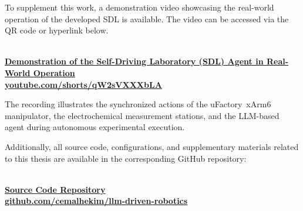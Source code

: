 \begin{anhang}
\begin{lstlisting}[language=json, caption={Fifth User's Inputs}]
\end{lstlisting}

\newpage
{}

To supplement this work, a demonstration video showcasing the real-world operation of the developed SDL is available. The video can be accessed via the QR code or hyperlink below.

\begin{center}
 \\[5pt]
\href{https://youtube.com/shorts/qW2sVXXXbLA}{\textbf{Demonstration of the Self-Driving Laboratory (SDL) Agent in Real-World Operation \\ youtube.com/shorts/qW2sVXXXbLA}}
\end{center}

The recording illustrates the synchronized actions of the uFactory~xArm6 manipulator, the electrochemical measurement stations, and the LLM-based agent during autonomous experimental execution.


Additionally, all source code, configurations, and supplementary materials related to this thesis are available in the corresponding GitHub repository:

\begin{center}
 \\[5pt]
\href{https://github.com/cemalhekim/llm-driven-robotics}{\textbf{Source Code Repository \\ github.com/cemalhekim/llm-driven-robotics}}
\end{center}

\end{anhang}
